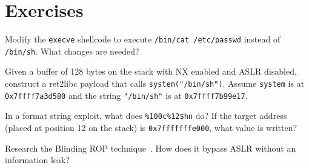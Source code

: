 \section{Exercises}

\begin{exercise}
	Modify the \texttt{execve} shellcode to execute \texttt{/bin/cat /etc/passwd} instead of \texttt{/bin/sh}. What changes are needed?
\end{exercise}

\begin{exercise}
	Given a buffer of 128 bytes on the stack with NX enabled and ASLR disabled, construct a ret2libc payload that calls \texttt{system("/bin/sh")}. Assume \texttt{system} is at \texttt{0x7ffff7a3d580} and the string \texttt{"/bin/sh"} is at \texttt{0x7ffff7b99e17}.
\end{exercise}

\begin{exercise}
	In a format string exploit, what does \texttt{\%100c\%12\$hn} do? If the target address (placed at position 12 on the stack) is \texttt{0x7fffffffe000}, what value is written?
\end{exercise}

\begin{exercise}
	Research the Blinding ROP technique~\cite{bittau2014hacking}. How does it bypass ASLR without an information leak?
\end{exercise}
